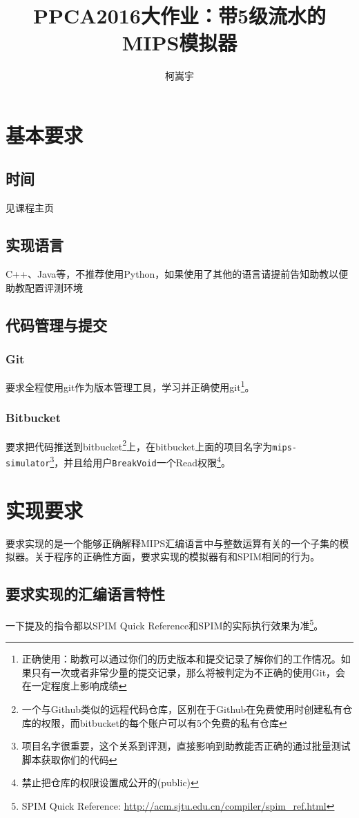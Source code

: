 \documentclass[a4paper, 11pt]{article}
\title{PPCA2016大作业：带5级流水的MIPS模拟器}
\author{柯嵩宇}
\begin{document}
\maketitle
\tableofcontents

\newpage
\section{基本要求}
\subsection{时间}
	见课程主页
\subsection{实现语言}
	C++、Java等，不推荐使用Python，如果使用了其他的语言请提前告知助教以便助教配置评测环境
\subsection{代码管理与提交}
\subsubsection{Git}
	要求全程使用git作为版本管理工具，学习并正确使用git\footnote{正确使用：助教可以通过你们的历史版本和提交记录了解你们的工作情况。如果只有一次或者非常少量的提交记录，那么将被判定为不正确的使用Git，会在一定程度上影响成绩}。
\subsubsection{Bitbucket}
	要求把代码推送到bitbucket\footnote{一个与Github类似的远程代码仓库，区别在于Github在免费使用时创建私有仓库的权限，而bitbucket的每个账户可以有5个免费的私有仓库}上，在bitbucket上面的项目名字为\texttt{mips-simulator}\footnote{项目名字很重要，这个关系到评测，直接影响到助教能否正确的通过批量测试脚本获取你们的代码}，并且给用户\texttt{BreakVoid}一个Read权限\footnote{禁止把仓库的权限设置成公开的(public)}。
\section{实现要求}
要求实现的是一个能够正确解释MIPS汇编语言中与整数运算有关的一个子集的模拟器。关于程序的正确性方面，要求实现的模拟器有和SPIM相同的行为。
\subsection{要求实现的汇编语言特性}
	一下提及的指令都以SPIM Quick Reference和SPIM的实际执行效果为准\footnote{SPIM Quick Reference: \url{http://acm.sjtu.edu.cn/compiler/spim_ref.html}}。
\end{document}
